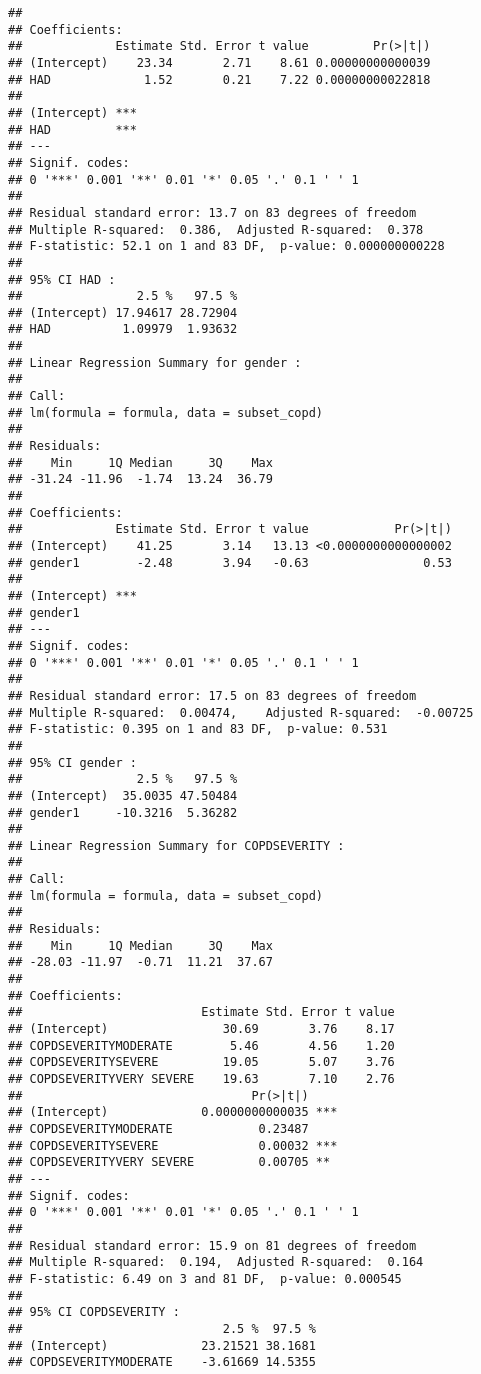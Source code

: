 \documentclass[
]{article}
\begin{document}
\begin{verbatim}
## 
## Coefficients:
##             Estimate Std. Error t value         Pr(>|t|)
## (Intercept)    23.34       2.71    8.61 0.00000000000039
## HAD             1.52       0.21    7.22 0.00000000022818
##                
## (Intercept) ***
## HAD         ***
## ---
## Signif. codes:  
## 0 '***' 0.001 '**' 0.01 '*' 0.05 '.' 0.1 ' ' 1
## 
## Residual standard error: 13.7 on 83 degrees of freedom
## Multiple R-squared:  0.386,  Adjusted R-squared:  0.378 
## F-statistic: 52.1 on 1 and 83 DF,  p-value: 0.000000000228
## 
## 95% CI HAD :
##                2.5 %   97.5 %
## (Intercept) 17.94617 28.72904
## HAD          1.09979  1.93632
## 
## Linear Regression Summary for gender :
## 
## Call:
## lm(formula = formula, data = subset_copd)
## 
## Residuals:
##    Min     1Q Median     3Q    Max 
## -31.24 -11.96  -1.74  13.24  36.79 
## 
## Coefficients:
##             Estimate Std. Error t value            Pr(>|t|)
## (Intercept)    41.25       3.14   13.13 <0.0000000000000002
## gender1        -2.48       3.94   -0.63                0.53
##                
## (Intercept) ***
## gender1        
## ---
## Signif. codes:  
## 0 '***' 0.001 '**' 0.01 '*' 0.05 '.' 0.1 ' ' 1
## 
## Residual standard error: 17.5 on 83 degrees of freedom
## Multiple R-squared:  0.00474,    Adjusted R-squared:  -0.00725 
## F-statistic: 0.395 on 1 and 83 DF,  p-value: 0.531
## 
## 95% CI gender :
##                2.5 %   97.5 %
## (Intercept)  35.0035 47.50484
## gender1     -10.3216  5.36282
## 
## Linear Regression Summary for COPDSEVERITY :
## 
## Call:
## lm(formula = formula, data = subset_copd)
## 
## Residuals:
##    Min     1Q Median     3Q    Max 
## -28.03 -11.97  -0.71  11.21  37.67 
## 
## Coefficients:
##                         Estimate Std. Error t value
## (Intercept)                30.69       3.76    8.17
## COPDSEVERITYMODERATE        5.46       4.56    1.20
## COPDSEVERITYSEVERE         19.05       5.07    3.76
## COPDSEVERITYVERY SEVERE    19.63       7.10    2.76
##                                Pr(>|t|)    
## (Intercept)             0.0000000000035 ***
## COPDSEVERITYMODERATE            0.23487    
## COPDSEVERITYSEVERE              0.00032 ***
## COPDSEVERITYVERY SEVERE         0.00705 ** 
## ---
## Signif. codes:  
## 0 '***' 0.001 '**' 0.01 '*' 0.05 '.' 0.1 ' ' 1
## 
## Residual standard error: 15.9 on 81 degrees of freedom
## Multiple R-squared:  0.194,  Adjusted R-squared:  0.164 
## F-statistic: 6.49 on 3 and 81 DF,  p-value: 0.000545
## 
## 95% CI COPDSEVERITY :
##                            2.5 %  97.5 %
## (Intercept)             23.21521 38.1681
## COPDSEVERITYMODERATE    -3.61669 14.5355

\end{verbatim}
\end{document}
